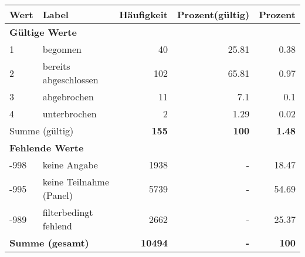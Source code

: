      \begin{longtable}{lXrrr}
     \toprule
     \textbf{Wert} & \textbf{Label} & \textbf{Häufigkeit} & \textbf{Prozent(gültig)} & \textbf{Prozent} \\
     \endhead
     \midrule
     \multicolumn{5}{l}{\textbf{Gültige Werte}}\\

     1 &
     \multicolumn{1}{X}{ begonnen   } &


       \num{40} &
       \num[round-mode=places,round-precision=2]{25.81} &
         \num[round-mode=places,round-precision=2]{0.38} \\

     2 &
     \multicolumn{1}{X}{ bereits abgeschlossen   } &


       \num{102} &
       \num[round-mode=places,round-precision=2]{65.81} &
         \num[round-mode=places,round-precision=2]{0.97} \\

     3 &
     \multicolumn{1}{X}{ abgebrochen   } &


       \num{11} &
       \num[round-mode=places,round-precision=2]{7.1} &
         \num[round-mode=places,round-precision=2]{0.1} \\

     4 &
     \multicolumn{1}{X}{ unterbrochen   } &


       \num{2} &
       \num[round-mode=places,round-precision=2]{1.29} &
         \num[round-mode=places,round-precision=2]{0.02} \\
     \midrule
     \multicolumn{2}{l}{Summe (gültig)} &
       \textbf{\num{155}} &
     \textbf{\num{100}} &
       \textbf{\num[round-mode=places,round-precision=2]{1.48}} \\
     \multicolumn{5}{l}{\textbf{Fehlende Werte}}\\
       -998 &
       keine Angabe &
         \num{1938} &
        - &
         \num[round-mode=places,round-precision=2]{18.47} \\
       -995 &
       keine Teilnahme (Panel) &
         \num{5739} &
        - &
         \num[round-mode=places,round-precision=2]{54.69} \\
       -989 &
       filterbedingt fehlend &
         \num{2662} &
        - &
         \num[round-mode=places,round-precision=2]{25.37} \\
     \midrule
     \multicolumn{2}{l}{\textbf{Summe (gesamt)}} &
          \textbf{\num{10494}} &
        \textbf{-} &
        \textbf{\num{100}} \\
     \bottomrule
     \end{longtable}
     
